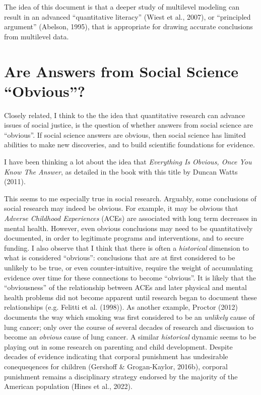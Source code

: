\documentclass[
  letterpaper,
  DIV=11,
  numbers=noendperiod]{scrreprt}
\begin{document}
The idea of this document is that a deeper study of multilevel modeling
can result in an advanced ``quantitative literacy'' (Wiest et al.,
2007), or ``principled argument'' (Abelson, 1995), that is appropriate
for drawing accurate conclusions from multilevel data.

\hypertarget{are-answers-from-social-science-obvious}{%
\section{Are Answers from Social Science
``Obvious''?}\label{are-answers-from-social-science-obvious}}

Closely related, I think to the the idea that quantitative research can
advance issues of social justice, is the question of whether answers
from social science are ``obvious''. If social science answers are
obvious, then social science has limited abilities to make new
discoveries, and to build scientific foundations for evidence.

I have been thinking a lot about the idea that \emph{Everything Is
Obvious, Once You Know The Answer}, as detailed in the book with this
title by Duncan Watts (2011).

This seems to me especially true in social research. Arguably, some
conclusions of social research may indeed be obvious. For example, it
may be obvious that \emph{Adverse Childhood Experiences} (ACEs) are
associated with long term decreases in mental health. However, even
obvious conclusions may need to be quantitatively documented, in order
to legitimate programs and interventions, and to secure funding. I also
observe that I think that there is often a \emph{historical} dimension
to what is considered ``obvious'': conclusions that are at first
considered to be unlikely to be true, or even counter-intuitive, require
the weight of accumulating evidence over time for these connections to
become ``obvious''. It is likely that the ``obviousness'' of the
relationship between ACEs and later physical and mental health problems
did not become apparent until research began to document these
relationships (e.g. Felitti et al. (1998)). As another example, Proctor
(2012) documents the way which smoking was first considered to be an
\emph{unlikely} cause of lung cancer; only over the course of several
decades of research and discussion to become an \emph{obvious} cause of
lung cancer. A similar \emph{historical} dynamic seems to be playing out
in some research on parenting and child development. Despite decades of
evidence indicating that corporal punishment has undesirable
conequeqences for children (Gershoff \& Grogan-Kaylor, 2016b), corporal
punishment remains a disciplinary strategy endorsed by the majority of
the American population (Hines et al., 2022).
\end{document}
